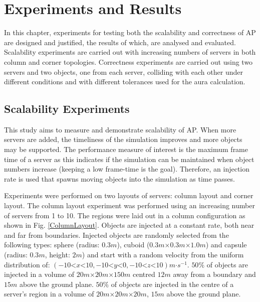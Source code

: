 \chapter{Experiments and Results}\label{Results}
In this chapter, experiments for testing both the scalability and correctness of AP are designed and justified, the results of which, are analysed and evaluated. Scalability experiments are carried out with increasing numbers of servers in both column and corner topologies. Correctness experiments are carried out using two servers and two objects, one from each server, colliding with each other under different conditions and with different tolerances used for the aura calculation.

\section{Scalability Experiments}
This study aims to measure and demonstrate scalability of AP. When more servers are added, the timeliness of the simulation improves and more objects may be supported. The performance measure of interest is the maximum frame time of a server as this indicates if the simulation can be maintained when object numbers increase (keeping a low frame-time is the goal). Therefore, an injection rate is used that spawns moving objects into the simulation as time passes.

Experiments were performed on two layouts of servers: column layout and corner layout. The column layout experiment was performed using an increasing number of servers from 1 to 10. The regions were laid out in a column configuration as shown in Fig. \ref{ColumnLayout}. Objects are injected at a constant rate, both near and far from boundaries. Injected objects are randomly selected from the following types: sphere (radius: $0.3m$), cuboid ($0.3m\mathord{\times}0.3m\mathord{\times}1.0m$) and capsule (radius: $0.3m$, height: $2m$) and start with a random velocity from the uniform distribution of: $(-10\mathord{<}x\mathord{<}10,-10\mathord{<}y\mathord{<}0,-10\mathord{<}z\mathord{<}10)m\mathord{\cdot}s^{-1}$. $50\%$ of objects are injected in a volume of $20m\mathord{\times}20m\mathord{\times}150m$ centred $12m$ away from a boundary and $15m$ above the ground plane. $50\%$ of objects are injected in the centre of a server's region in a volume of $20m\mathord{\times}20m\mathord{\times}20m$, $15m$ above the ground plane.

